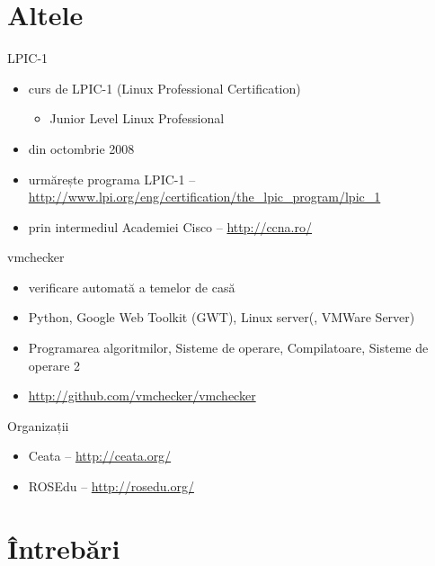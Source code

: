 \documentclass{beamer}
\begin{document}
\section{Altele}

\frame{\tableofcontents[currentsection]}

\begin{frame}{LPIC-1}
	\begin{itemize}
		\item curs de LPIC-1 (Linux Professional Certification)
			\begin{itemize}
				\item Junior Level Linux Professional
			\end{itemize}
		\item din octombrie 2008
		\item urmărește programa LPIC-1 --
		\url{http://www.lpi.org/eng/certification/the_lpic_program/lpic_1}
		\item prin intermediul Academiei Cisco -- \url{http://ccna.ro/}
	\end{itemize}
\end{frame}

\begin{frame}{vmchecker}
	\begin{itemize}
		\item verificare automată a temelor de casă
		\item Python, Google Web Toolkit (GWT), Linux server(, VMWare Server)
		\item Programarea algoritmilor, Sisteme de operare, Compilatoare,
		Sisteme de operare 2
		\item \url{http://github.com/vmchecker/vmchecker}
	\end{itemize}
\end{frame}

\begin{frame}{Organizații}
	\begin{itemize}
		\item Ceata -- \url{http://ceata.org/}
		\item ROSEdu -- \url{http://rosedu.org/}
	\end{itemize}
\end{frame}

\section{Întrebări}

\frame{\tableofcontents[currentsection]}
\end{document}
